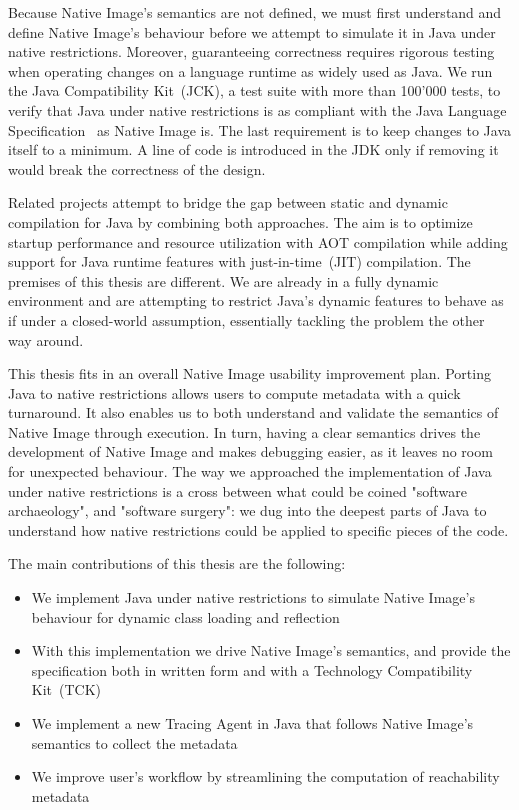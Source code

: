 Because Native Image's semantics are not defined, we must first understand and define Native Image's behaviour before we attempt to simulate it in Java under native restrictions. Moreover, guaranteeing correctness requires rigorous testing when operating changes on a language runtime as widely used as Java. We run the Java Compatibility Kit~(JCK), a test suite with more than 100'000 tests, to verify that Java under native restrictions is as compliant with the Java Language Specification~\cite{noauthor_java_nodate-3} as Native Image is.
The last requirement is to keep changes to Java itself to a minimum. A line of code is introduced in the JDK only if removing it would break the correctness of the design.

Related projects attempt to bridge the gap between static and dynamic compilation for Java by combining both approaches. The aim is to optimize startup performance and resource utilization with AOT compilation while adding support for Java runtime features with just-in-time~(JIT) compilation. The premises of this thesis are different. We are already in a fully dynamic environment and are attempting to restrict Java's dynamic features to behave as if under a closed-world assumption, essentially tackling the problem the other way around. 

This thesis fits in an overall Native Image usability improvement plan. Porting Java to native restrictions allows users to compute metadata with a quick turnaround. It also enables us to both understand and validate the semantics of Native Image through execution. In turn, having a clear semantics drives the development of Native Image and makes debugging easier, as it leaves no room for unexpected behaviour.
The way we approached the implementation of Java under native restrictions is a cross between what could be coined "software archaeology", and "software surgery": we dug into the deepest parts of Java to understand how native restrictions could be applied to specific pieces of the code.

The main contributions of this thesis are the following:
\begin{itemize}
  \item We implement Java under native restrictions to simulate Native Image's behaviour for dynamic class loading and reflection
  \item With this implementation we drive Native Image's semantics, and provide the specification both in written form and with a Technology Compatibility Kit~(TCK) 
  \item We implement a new Tracing Agent in Java that follows Native Image's semantics to collect the metadata 
  \item We improve user's workflow by streamlining the computation of reachability metadata
\end{itemize}